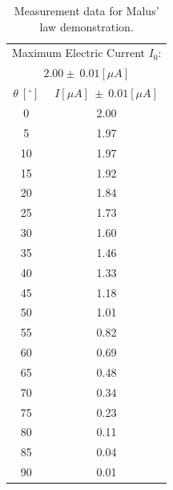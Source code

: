 \documentclass{article}
\begin{document}
\begin{table}[]
\centering
\begin{tabular}{cc}
\toprule
\multicolumn{2}{c}{Maximum   Electric Current $I_0$:} \\ 
\multicolumn{2}{c}{$2.00 \pm ~ 0.01 [\mu A]$} \\ \midrule
$\theta~[^{\circ}]$                & $I [\mu A]~\pm~0.01 [\mu A]$               \\ \midrule
0                                  & 2.00                                       \\
5                                  & 1.97                                       \\
10                                 & 1.97                                       \\
15                                 & 1.92                                       \\
20                                 & 1.84                                       \\
25                                 & 1.73                                       \\
30                                 & 1.60                                       \\
35                                 & 1.46                                       \\
40                                 & 1.33                                       \\
45                                 & 1.18                                       \\
50                                 & 1.01                                       \\
55                                 & 0.82                                       \\
60                                 & 0.69                                       \\
65                                 & 0.48                                       \\
70                                 & 0.34                                       \\
75                                 & 0.23                                       \\
80                                 & 0.11                                       \\
85                                 & 0.04                                       \\
90                                 & 0.01                                      \\ \bottomrule
\end{tabular}
\caption{Measurement data for Malus' law demonstration.}
\label{tab.Malus}
\end{table}
\end{document}
